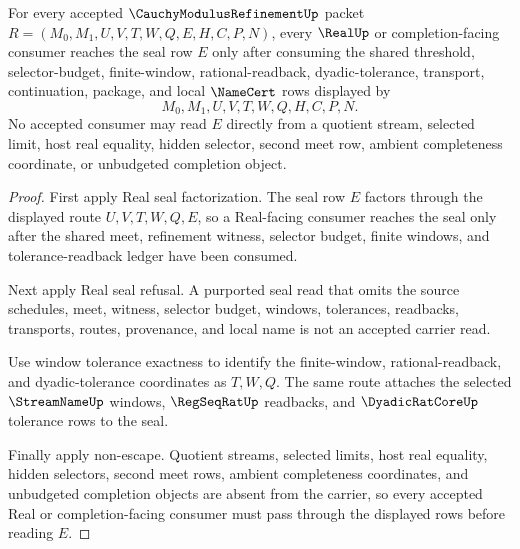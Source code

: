 \begin{theorem}
\label{thm:cauchy-modulus-refinement-real-seal-consumer-exhaustion}
For every accepted $\CauchyModulusRefinementUp$ packet $R=(M_0,M_1,U,V,T,W,Q,E,H,C,P,N)$, every $\RealUp$ or completion-facing consumer reaches the seal row $E$ only after consuming the shared threshold, selector-budget, finite-window, rational-readback, dyadic-tolerance, transport, continuation, package, and local $\NameCert$ rows displayed by
$$
M_0,M_1,U,V,T,W,Q,H,C,P,N.
$$
No accepted consumer may read $E$ directly from a quotient stream, selected limit, host real equality, hidden selector, second meet row, ambient completeness coordinate, or unbudgeted completion object.
\end{theorem}
\begin{proof}
First apply Real seal factorization. The seal row $E$ factors through the displayed route $U,V,T,W,Q,E$, so a Real-facing consumer reaches the seal only after the shared meet, refinement witness, selector budget, finite windows, and tolerance-readback ledger have been consumed.

Next apply Real seal refusal. A purported seal read that omits the source schedules, meet, witness, selector budget, windows, tolerances, readbacks, transports, routes, provenance, and local name is not an accepted carrier read.

Use window tolerance exactness to identify the finite-window, rational-readback, and dyadic-tolerance coordinates as $T,W,Q$. The same route attaches the selected $\StreamNameUp$ windows, $\RegSeqRatUp$ readbacks, and $\DyadicRatCoreUp$ tolerance rows to the seal.

Finally apply non-escape. Quotient streams, selected limits, host real equality, hidden selectors, second meet rows, ambient completeness coordinates, and unbudgeted completion objects are absent from the carrier, so every accepted Real or completion-facing consumer must pass through the displayed rows before reading $E$.
\end{proof}

